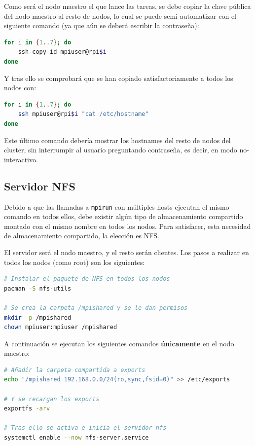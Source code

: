 Como será el nodo maestro el que lance las tareas, se debe copiar la clave pública del nodo maestro al resto de nodos, lo cual se puede semi-automatizar con el siguiente comando (ya que aún se deberá escribir la contraseña):

\begin{lstlisting}[language=bash]
for i in {1..7}; do
    ssh-copy-id mpiuser@rpi$i
done
\end{lstlisting}

Y tras ello se comprobará que se han copiado satisfactoriamente a todos los nodos con:
\begin{lstlisting}[language=bash]
for i in {1..7}; do
    ssh mpiuser@rpi$i "cat /etc/hostname"
done
\end{lstlisting}
Este último comando debería mostrar los hostnames del resto de nodos del cluster, sin interrumpir al usuario preguntando contraseña, es decir, en modo no-interactivo.


\subsection{Servidor NFS}
\label{ssec:serv_nfs}
Debido a que las llamadas a \texttt{mpirun} con múltiples hosts ejecutan el mismo comando en todos ellos, debe existir algún tipo de almacenamiento compartido montado con el mismo nombre en todos los nodos. Para satisfacer, esta necesidad de almacenamiento compartido, la elección es NFS.

El servidor será el nodo maestro, y el resto serán clientes. Los pasos a realizar en todos los nodos (como root) son los siguientes:

\begin{lstlisting}[language=bash]
# Instalar el paquete de NFS en todos los nodos
pacman -S nfs-utils

# Se crea la carpeta /mpishared y se le dan permisos
mkdir -p /mpishared
chown mpiuser:mpiuser /mpishared
\end{lstlisting}

A continuación se ejecutan los siguientes comandos \textbf{únicamente} en el nodo maestro:

\begin{lstlisting}[language=bash]
# Añadir la carpeta compartida a exports
echo "/mpishared 192.168.0.0/24(ro,sync,fsid=0)" >> /etc/exports

# Y se recargan los exports
exportfs -arv

# Tras ello se activa e inicia el servidor nfs
systemctl enable --now nfs-server.service
\end{lstlisting}

